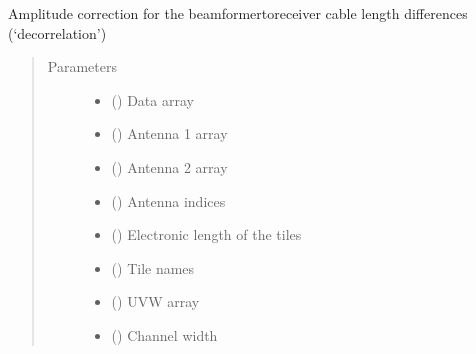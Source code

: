 \documentclass[letterpaper,10pt,english]{sphinxmanual}
\begin{document}
\begin{fulllineitems}
\label{\detokenize{paircars:paircars.decor.apply_acorr}}
\sphinxAtStartPar
Amplitude correction for the beamformer\sphinxhyphen{}to\sphinxhyphen{}receiver cable length differences (‘decorrelation’)
\begin{quote}\begin{description}
\item[{Parameters}] \leavevmode\begin{itemize}
\item {} 
\sphinxAtStartPar
{} () \textendash{} Data array

\item {} 
\sphinxAtStartPar
{} () \textendash{} Antenna 1 array

\item {} 
\sphinxAtStartPar
{} () \textendash{} Antenna 2 array

\item {} 
\sphinxAtStartPar
{} () \textendash{} Antenna indices

\item {} 
\sphinxAtStartPar
{} () \textendash{} Electronic length of the tiles

\item {} 
\sphinxAtStartPar
{} () \textendash{} Tile names

\item {} 
\sphinxAtStartPar
{} () \textendash{} UVW array

\item {} 
\sphinxAtStartPar
{} () \textendash{} Channel width


\end{itemize}
\end{description}
\end{quote}
\end{fulllineitems}
\end{document}
